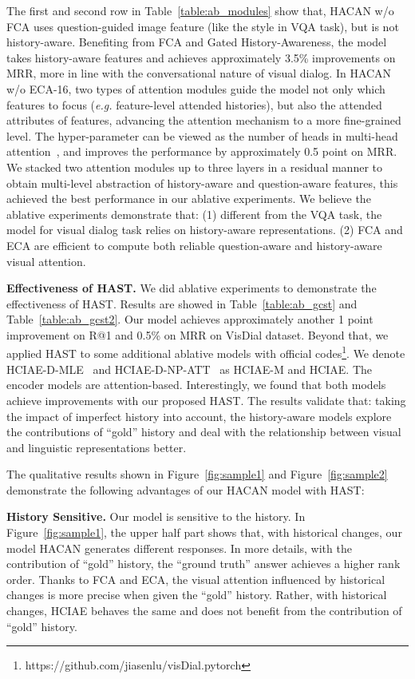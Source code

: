 \documentclass[10pt,twocolumn,letterpaper]{article}
\begin{document}
The first and second row in Table~\ref{table:ab_modules} show that, HACAN w/o FCA uses question-guided image feature (like the style in VQA task), but is not history-aware. Benefiting from FCA and Gated History-Awareness, the model takes history-aware features and achieves approximately 3.5\% improvements on MRR, more in line with the conversational nature of visual dialog. In HACAN w/o ECA-16, two types of attention modules guide the model not only which features to focus (\emph{e.g.} feature-level attended histories), but also the attended attributes of features, advancing the attention mechanism to a more fine-grained level. The hyper-parameter  can be viewed as the number of heads in multi-head attention~\cite{vaswani2017attention}, and improves the performance by approximately 0.5 point on MRR. We stacked two attention modules up to three layers in a residual manner to obtain multi-level abstraction of history-aware and question-aware features, this achieved the best performance in our ablative experiments. We believe the ablative experiments demonstrate that: (1) different from the VQA task, the model for visual dialog task relies on history-aware representations. (2) FCA and ECA are efficient to compute both reliable question-aware and history-aware visual attention.

\noindent \textbf{Effectiveness of HAST.} We did ablative experiments to demonstrate the effectiveness of HAST. Results are showed in Table~\ref{table:ab_gcst} and Table~\ref{table:ab_gcst2}. Our model achieves approximately another 1 point improvement on R@1 and 0.5\% on MRR on VisDial dataset. Beyond that, we applied HAST to some additional ablative models with official codes\footnote{https://github.com/jiasenlu/visDial.pytorch}. We denote HCIAE-D-MLE~\cite{lu2017best} and HCIAE-D-NP-ATT~\cite{lu2017best} as HCIAE-M and HCIAE. The encoder models are attention-based. Interestingly, we found that both models achieve improvements with our proposed HAST. The results validate that: taking the impact of imperfect history into account, the history-aware models explore the contributions of ``gold'' history and deal with the relationship between visual and linguistic representations better.

The qualitative results shown in Figure~\ref{fig:sample1} and Figure~\ref{fig:sample2} demonstrate the following advantages of our HACAN model with HAST: 

\noindent \textbf{History Sensitive.} Our model is sensitive to the history. In Figure~\ref{fig:sample1}, the upper half part shows that, with historical changes, our model HACAN generates different responses. In more details, with the contribution of ``gold'' history, the ``ground truth'' answer achieves a higher rank order. Thanks to FCA and ECA, the visual attention influenced by historical changes is more precise when given the ``gold'' history. Rather, with historical changes, HCIAE behaves the same and does not benefit from the contribution of ``gold'' history.
\end{document}
